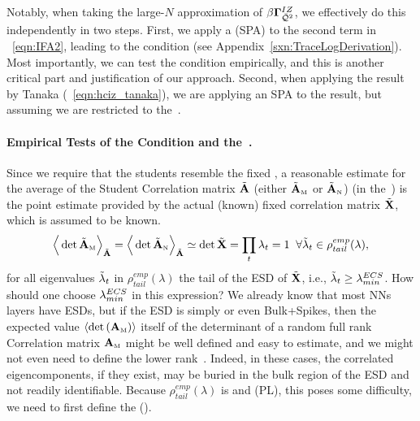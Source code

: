 Notably, when taking the large-$N$ approximation of $\beta\mathbf{\Gamma}^{IZ}_{\bar{\mathcal{Q}}^{2}}$, we effectively do this independently in two steps.
First, we apply a \SaddlePointApproximation (SPA) to the second term in \EQN~\ref{eqn:IFA2},
leading to the \TRACELOG condition (see Appendix~\ref{sxn:TraceLogDerivation}).
Most importantly, we can test the \TRACELOG condition empirically,
and this is another critical part and justification of our \SETOL approach.
Second, when applying the result by Tanaka (\EQN~\ref{eqn:hciz_tanaka}),
we are applying an SPA to the result, but assuming we are
restricted to the~\ECS.

\paragraph{Empirical Tests of the \TRACELOG Condition and the~\ECS.}

Since we require that the students resemble the fixed \Teacher, a reasonable estimate for the average of the Student
Correlation matrix $\tilde{\mathbf{A}}$
(either $\tilde{\mathbf{A}}_{\text{\tiny M}}$ or $\tilde{\mathbf{A}}_{\text{\tiny N}}$)  (in the~\ECS)  is the point estimate provided by the actual (known) fixed \Teacher correlation matrix $\tilde{\mathbf{X}}$, which is assumed to be known. %
\begin{align} 
\label{eqn:IFA-ppint}
\Big\langle \det\tilde{\mathbf{A}}_{\text{\tiny M}}\Big\rangle_{\tilde{\mathbf{A}}}=
\Big\langle \det\tilde{\mathbf{A}}_{\text{\tiny N}}\Big\rangle_{\tilde{\mathbf{A}}}
\simeq\det\tilde{\mathbf{X}}=\prod_{t}\lambda_{t}=1\;\;\forall\tilde{\lambda}_{t}\in\rho^{emp}_{tail}(\lambda) ,
\end{align}
for all eigenvalues $\tilde{\lambda}_{t}$ in $\rho^{emp}_{tail}(\lambda)$ the tail of the
ESD of $\tilde{\mathbf{X}}$, i.e., $\tilde{\lambda}_{t}\ge\lambda^{ECS}_{min}$.
%
How should one choose $\lambda^{ECS}_{min}$ in this expression?
We already know that most NNs layers have \FatTailed ESDs, but
if the \Teacher ESD is simply \emph{\RandomLike} or even Bulk+Spikes, then the expected value
$\langle\mbox{}{\text{det}}\left({\mathbf{A}}_{\text{\tiny M}}\right)\rangle$ itself of the determinant
of a random full rank \Student Correlation matrix ${\mathbf{A}}_{\text{\tiny M}}$
might be well defined and easy to estimate, and we might not even need to define the lower rank~\ECS.
Indeed, in these cases, the correlated eigencomponents, if they exist, may be buried in the bulk
region of the ESD and not readily identifiable.
Because $\rho_{tail}^{emp}(\lambda)$ is \FatTailed
and \PowerLaw (PL), this poses some difficulty, we need to first define the \EffectiveCorrelationSpace (\ECS).


